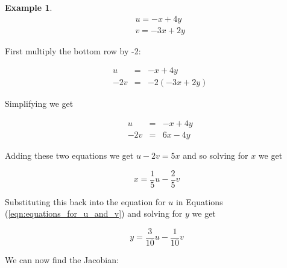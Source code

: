 \documentclass{article}
\theoremstyle{definition}
\newtheorem{example}{Example}[section]
\begin{document}
\begin{example}
\bigskip
\begin{equation*}
\begin{array}{llll}
&u = -x + 4y \\
&v = -3x + 2y 
\end{array}
\end{equation*}

\bigskip
\noindent
First multiply the bottom row by -2:


\bigskip
\begin{equation*}
\begin{array}{rrll}
&u &=& -x + 4y \\
&-2 v &=& -2 (-3x + 2y) 
\end{array}
\end{equation*}

\bigskip
\noindent
Simplifying we get

\bigskip
\begin{equation}
\begin{array}{rrrr}
&u &=& -x + 4y \\
&-2 v &=& 6x - 4y 
\label{eqn:equations_for_u_and_v}
\end{array}
\end{equation}

\bigskip
\noindent
Adding these two equations we get $u - 2v = 5x$
and so solving for $x$ we get

\bigskip
\begin{equation}
x = \frac{1}{5} u - \frac{2}{5} v
\label{eqn:transformation_x}
\end{equation}

\bigskip
\noindent
Substituting this back into the equation for $u$ 
in Equations (\ref{eqn:equations_for_u_and_v})
and solving for $y$ we get

\bigskip
\begin{equation}
y = \frac{3}{10} u - \frac{1}{10} v
\label{eqn:transformation_y}
\end{equation}

\bigskip
\noindent
We can now find the Jacobian:


\end{example}
\end{document}
